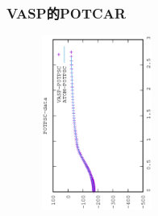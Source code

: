 {\frame
{
	\frametitle{\rm{VASP}的\rm{POTCAR}}
\begin{minipage}{0.58\textwidth}
\centering
\vspace{-0.10in}
\fontsize{3.3pt}{1.9pt}\selectfont{
}
\end{minipage}
\hfill
\begin{minipage}{0.40\textwidth}
\begin{figure}[t!]
\centering
\vspace{-0.05in}
\includegraphics[height=2.25in,width=1.5in,viewport=0 0 350 550, angle=-90, clip]{Figures/POTPSC-data.eps}
\label{Pseudopotential-core_Function}
\end{figure}
\end{minipage}
}

}
